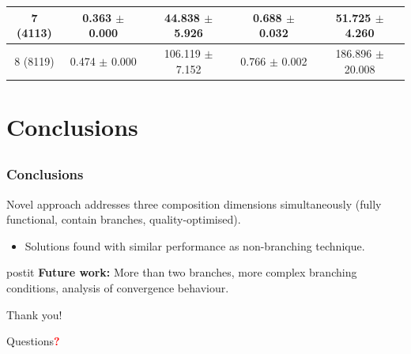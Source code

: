 \documentclass[xcolor={table}]{beamer}
\begin{document}
\begin{frame}
\begin{table}
{\begin{tabular}{c|c|c|c|c|}
\multicolumn{1}{|c|}{7 (4113)}            & 0.363 $\pm$ 0.000                          & 44.838 $\pm$ 5.926                          & 0.688 $\pm$ 0.032                          & 51.725 $\pm$ 4.260                          \\ \hline
\multicolumn{1}{|c|}{8 (8119)}            & 0.474 $\pm$ 0.000                          & 106.119 $\pm$ 7.152                         & 0.766 $\pm$ 0.002                          & 186.896 $\pm$ 20.008                        \\ \hline
\end{tabular}
}
\end{table}


\end{frame}

\section{Conclusions}
\subsection{}

\begin{frame}
\frametitle{Conclusions}
Novel approach addresses {\color{blue}three composition dimensions} simultaneously (fully functional, contain branches, quality-optimised).

\begin{itemize}
\item Solutions found with similar performance as non-branching technique.
\end{itemize}

\vfill

\begin{beamercolorbox}[sep=1em]{postit}
\textbf{Future work:} More than two branches, more complex branching conditions, analysis of convergence behaviour.
\end{beamercolorbox}
\end{frame}



\begin{frame}
\Large
\centerline{Thank you!}
\medskip
\centerline{Questions\textcolor{red}{\textbf{?}}}
\end{frame}

\end{document}
